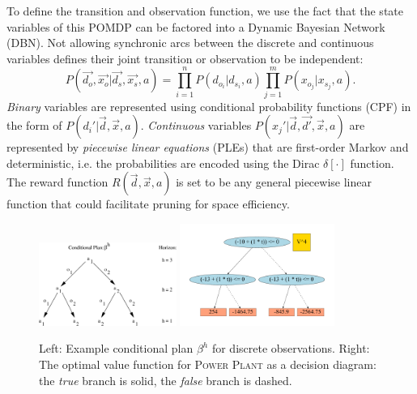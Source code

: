 \documentclass{article} %
\begin{document}
To define the transition and observation function, we use the fact that the state variables of this POMDP can be factored into a Dynamic Bayesian Network (DBN). Not allowing synchronic arcs between the discrete and continuous variables defines their joint transition or observation to be independent: 
{\footnotesize
\begin{equation}
P(\vec{d_o},\vec{x_o}|\vec{d_s},\vec{x_s},a) = 
\prod_{i=1}^n P(d_{o_i}|d_{s_i},a) \prod_{j=1}^m P(x_{o_j}|x_{s_j},a). \nonumber 
\end{equation}}
\emph{Binary} variables are represented using conditional probability functions (CPF) in the form of $P(d_i'|\vec{d},\vec{x},a)$. \emph{Continuous} variables
$P(x_j'|\vec{d},\vec{d'},\vec{x},a)$ are represented by \emph{piecewise
linear equations} (PLEs) that are first-order Markov and deterministic, i.e. the probabilities are encoded using the Dirac $\delta[\cdot]$ function. The reward function $R(\vec{d},\vec{x},a)$ is set to be any general piecewise linear  function that could facilitate pruning for space efficiency.%
\begin{figure}[t!]
\begin{center}
\includegraphics[width=0.4\textwidth]{pics/cond_plan2.pdf}
\includegraphics[width=0.45\textwidth]{pics/b1-4.pdf}
\end{center}
\vspace{-2mm}
\caption{\footnotesize Left: Example conditional plan $\beta^h$ for discrete observations. Right: The optimal value function for \textsc{Power Plant}
as a decision diagram: 
the \emph{true} branch is solid, the \emph{false}
branch is dashed.}
\label{fig:cond_plan}
\vspace{-1mm}
\end{figure}
\end{document}
